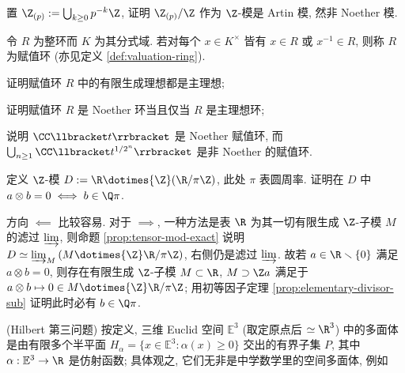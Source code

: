 \begin{Exercises}
\begin{enumerate}
		\end{enumerate}
	\item 置 $\Z_{(p)} := \bigcup_{k \geq 0} p^{-k}\Z$, 证明 $\Z_{(p)}/\Z$ 作为 $\Z$-模是 Artin 模, 然非 Noether 模.
	\item 令 $R$ 为整环而 $K$ 为其分式域. 若对每个 $x \in K^\times$ 皆有 $x \in R$ 或 $x^{-1} \in R$, 则称 $R$ 为赋值环 (亦见定义 \ref{def:valuation-ring}).
		\begin{compactenum}[(i)]
			\item 证明赋值环 $R$ 中的有限生成理想都是主理想;
			\item 证明赋值环 $R$ 是 Noether 环当且仅当 $R$ 是主理想环;
			\item 说明 $\CC\llbracket t \rrbracket$ 是 Noether 赋值环, 而 $\bigcup_{n \geq 1} \CC \llbracket t^{1/2^n} \rrbracket$ 是非 Noether 的赋值环.
		\end{compactenum}
	\item 定义 $\Z$-模 $D := \R \dotimes{\Z} (\R/\pi\Z)$, 此处 $\pi$ 表圆周率. 证明在 $D$ 中 $a \otimes b = 0 \iff b \in \Q\pi$.
		\begin{hint}
			方向 $\impliedby$ 比较容易. 对于 $\implies$, 一种方法是表 $\R$ 为其一切有限生成 $\Z$-子模 $M$ 的滤过 $\varinjlim$, 则命题 \ref{prop:tensor-mod-exact} 说明 $D \simeq \varinjlim_M \left( M \dotimes{\Z} \R/\pi\Z \right)$, 右侧仍是滤过 $\varinjlim$. 故若 $a \in \R \smallsetminus \{0\}$ 满足 $a \otimes b = 0$, 则存在有限生成 $\Z$-子模 $M \subset \R$, $M \supset \Z a$ 满足于 $a \otimes b \mapsto 0 \in M \dotimes{\Z} \R/\pi\Z$; 用初等因子定理 \ref{prop:elementary-divisor-sub} 证明此时必有 $b \in \Q\pi$.
		\end{hint}
	\item (Hilbert 第三问题) 按定义, 三维 Euclid 空间 $\mathbb{E}^3$ (取定原点后 $\simeq \R^3$) 中的多面体是由有限多个半平面 $H_\alpha = \{x \in \mathbb{E}^3: \alpha(x) \geq 0 \}$ 交出的有界子集 $P$, 其中 $\alpha: \mathbb{E}^3 \to \R$ 是仿射函数; 具体观之, 它们无非是中学数学里的空间多面体, 例如
	\begin{center} \qquad {}
\end{center}
\end{Exercises}
